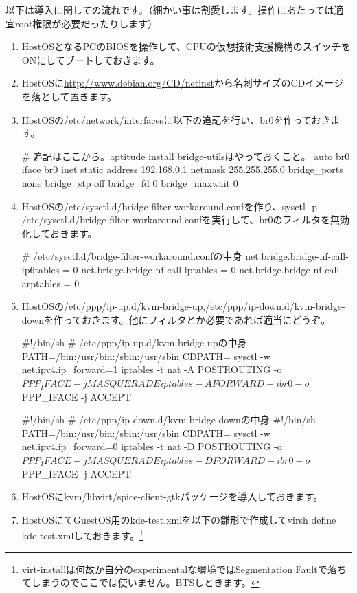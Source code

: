 \documentclass[mingoth,a4paper]{jsarticle}
\begin{document}
以下は導入に関しての流れです。（細かい事は割愛します。操作にあたっては適宜root権限が必要だったりします）
\begin{enumerate}
\item HostOSとなるPCのBIOSを操作して、CPUの仮想技術支援機構のスイッチをONにしてブートしておきます。
\item HostOSに\url{http://www.debian.org/CD/netinst}から名刺サイズのCDイメージを落として置きます。
\item HostOSの/etc/network/interfacesに以下の追記を行い、br0を作っておきます。
\begin{commandline}
# 追記はここから。aptitude install bridge-utilsはやっておくこと。
auto br0
iface br0 inet static
        address 192.168.0.1
        netmask 255.255.255.0
        bridge_ports none
        bridge_stp off
        bridge_fd 0
        bridge_maxwait 0
\end{commandline}
\item HostOSの/etc/sysctl.d/bridge-filter-workaround.confを作り、sysctl -p /etc/sysctl.d/bridge-filter-workaround.confを実行して、br0のフィルタを無効化しておきます。
\begin{commandline}
# /etc/sysctl.d/bridge-filter-workaround.confの中身
net.bridge.bridge-nf-call-ip6tables = 0
net.bridge.bridge-nf-call-iptables = 0
net.bridge.bridge-nf-call-arptables = 0
\end{commandline}
\item HostOSの/etc/ppp/ip-up.d/kvm-bridge-up,/etc/ppp/ip-down.d/kvm-bridge-downを作っておきます。他にフィルタとか必要であれば適当にどうぞ。
\begin{commandline}
#!/bin/sh
# /etc/ppp/ip-up.d/kvm-bridge-upの中身
PATH=/bin:/usr/bin:/sbin:/usr/sbin
CDPATH=
sysctl -w net.ipv4.ip_forward=1
iptables -t nat -A POSTROUTING -o $PPP_IFACE -j MASQUERADE
iptables -A FORWARD -i br0 -o $PPP_IFACE -j ACCEPT
\end{commandline}
\begin{commandline}
#!/bin/sh
# /etc/ppp/ip-down.d/kvm-bridge-downの中身
#!/bin/sh
PATH=/bin:/usr/bin:/sbin:/usr/sbin
CDPATH=
sysctl -w net.ipv4.ip_forward=0
iptables -t nat -D POSTROUTING -o $PPP_IFACE -j MASQUERADE
iptables -D FORWARD -i br0 -o $PPP_IFACE -j ACCEPT
\end{commandline}
\item HostOSにkvm/libvirt/spice-client-gtkパッケージを導入しておきます。
\item HostOSにてGuestOS用のkde-test.xmlを以下の雛形で作成してvirsh define kde-test.xmlしておきます。\footnote{virt-installは何故か自分のexperimentalな環境ではSegmentation Faultで落ちてしまうのでここでは使いません。BTSしときます。}

\end{enumerate}
\end{document}
